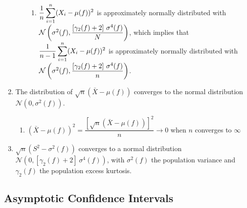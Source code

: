 \begin{enumerate}
\begin{enumerate}
\begin{enumerate}
            \item $\dfrac{1}{ n} \displaystyle\sum^n _{i=1}(X _i - \mu ( f ))^2$ is approximately normally distributed with $\mathcal{N} \left(\sigma ^ 2( f ), \dfrac{[\gamma_2( f ) + 2]\ \sigma  ^4 ( f )}{N}\right)$,
            which implies that $\dfrac{1}{n-1} \displaystyle\sum^n _{i=1}(X_ i - \mu ( f ))^2$ is approximately normally distributed with
            \\[0.2cm]
            $\mathcal{N} \left(\sigma ^ 2( f ), \dfrac{[\gamma_2( f ) + 2]\ \sigma ^ 4( f )}{n}\right)$.
            \hfill \cite{statistics/book/Statistics-for-Data-Scientists/Maurits-Kaptein}
        \end{enumerate}
    \end{enumerate}

    \item The distribution of $\sqrt{n}( \bar{X} - \mu( f ))$ converges to the normal distribution $\mathcal{N} (0, \sigma ^2( f ))$.
    \hfill \cite{statistics/book/Statistics-for-Data-Scientists/Maurits-Kaptein}
    \begin{enumerate}
        \item
        $
            ( \bar{X} - \mu ( f ))^2
            = \dfrac{[\sqrt{n}( \bar{X} - \mu ( f ))]^2}{n} \to 0
        $
        when $n$ converges to $\infty$
        \hfill \cite{statistics/book/Statistics-for-Data-Scientists/Maurits-Kaptein}
    \end{enumerate}

    \item $\sqrt{n}(S^2 - \sigma  ^2( f ))$ converges to a normal distribution  $\mathcal{N} (0, [\gamma_2( f ) + 2]\ \sigma ^ 4( f ))$, with $\sigma ^ 2( f )$ the population variance and $\gamma_2( f )$ the population excess kurtosis.
    \hfill \cite{statistics/book/Statistics-for-Data-Scientists/Maurits-Kaptein}
\end{enumerate}








\subsection{Asymptotic Confidence Intervals}

